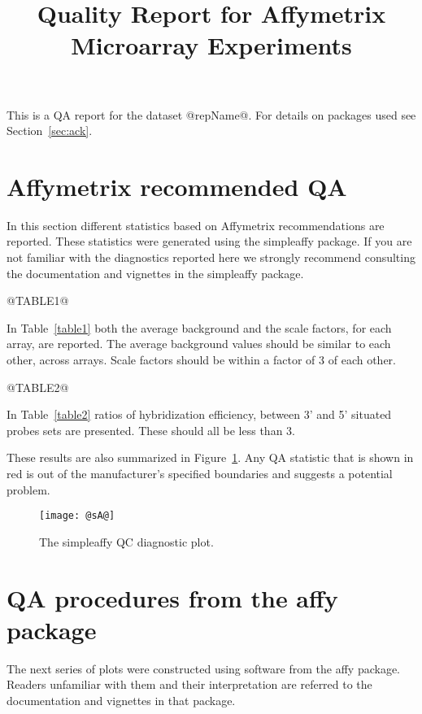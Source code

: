 \documentclass[11pt]{article}
\newcommand{\Rpackage}[1]{{\textsf{#1}}}
\begin{document}
\title{Quality Report for Affymetrix Microarray Experiments}

\maketitle

This is a QA report for the dataset @repName@.
For details on packages used see Section~\ref{sec:ack}.

\section{Affymetrix recommended QA}

In this section different statistics based on Affymetrix recommendations
are reported. These statistics were generated using the \Rpackage{simpleaffy} 
package. If you are not familiar with the diagnostics reported here we
strongly recommend consulting the documentation and vignettes in the
\Rpackage{simpleaffy} package.

@TABLE1@


In Table~\ref{table1} both the average background and the scale 
factors, for each array, are reported.  The average background values should 
be similar to each other, across arrays. Scale factors should be within
a factor of 3 of each other.

@TABLE2@

In Table~\ref{table2} ratios of hybridization efficiency, between 3' and
5' situated probes sets are presented. These should all be less than 3.

These results are also summarized in Figure~\ref{fig:sA}. Any QA statistic
that is shown in red is out of the manufacturer's specified boundaries
and suggests a potential problem.


\begin{figure}[tp]
  \centering
\texttt{[image: @sA@]}

\caption{\label{fig:sA}%
The \Rpackage{simpleaffy} QC diagnostic plot.}
\end{figure}

\section{QA procedures from the \Rpackage{affy} package}

The next series of plots were constructed using software from the 
\Rpackage{affy} package. Readers unfamiliar with them and their
interpretation are referred to the documentation and vignettes in
that package.
\end{document}
